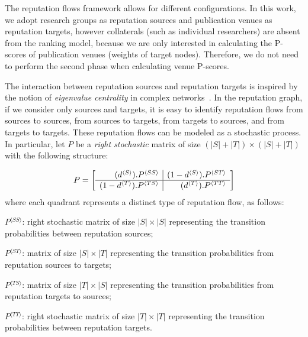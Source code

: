 \documentclass[notitlepage]{svjour3}
\begin{document}
The reputation flows framework allows for different configurations.
In this work, we adopt research groups as reputation sources and publication 
venues as reputation targets, however collaterals (such as individual researchers) 
are absent from the ranking model, because we are only interested in calculating the 
P-scores of publication venues (weights of target nodes). Therefore, we do not need to
perform the second phase when calculating venue P-scores.


The interaction between reputation sources and reputation targets is inspired by the 
notion of {\em eigenvalue centrality} in complex 
networks~\cite{Brin1998,Langville2008,Langville2008,Newman2010}. 
In the reputation graph, if we consider only sources and targets, it is easy to 
identify reputation flows from sources to sources, from sources to targets, from 
targets to sources, and from targets to targets. These reputation flows can be 
modeled as a stochastic process. 
In particular, let $P$ be a \emph{right stochastic} %
matrix of size $(|S|+|T|) \times (|S|+|T|)$ with the following structure: 

\newcommand{\bkt}[1]{ {^{\langle #1 \rangle}} }

\begin{align}\label{eq:newp}
P =
\left[
\begin{array}{r | r}
(d\bkt{S}) . P\bkt{SS}  & (1-d\bkt{S}) . P\bkt{ST} \\
\hline
(1-d\bkt{T}) . P\bkt{TS}  & (d\bkt{T}) . P\bkt{TT} \\
\end{array}
\right]
\end{align}
\noindent where each quadrant represents a distinct type of reputation flow, as follows: 

\begin{description}
\item $P\bkt{SS}$: right stochastic matrix of size $|S|\times |S|$ representing the 
transition probabilities between reputation sources;
\item $P\bkt{ST}$: matrix of size $|S|\times |T|$ representing the transition probabilities from reputation sources to targets;
\item $P\bkt{TS}$: matrix of size $|T|\times |S|$ representing the transition probabilities from reputation targets to sources;
\item $P\bkt{TT}$: right stochastic matrix of size $|T|\times |T|$ representing the transition probabilities between reputation targets.
\end{description}
\end{document}
